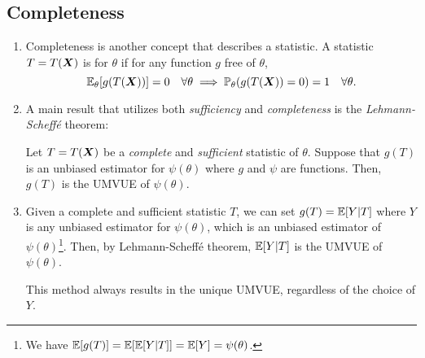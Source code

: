 \subsection{Completeness}
\begin{enumerate}
\item Completeness is another concept that describes a statistic. A statistic
\(T=T(\vb*{X})\) is  for \(\theta\) if for any function \(g\)
free of \(\theta\), 
\[
\mathbb{E}_{\theta}\qty[g(T(\vb*{X}))]=0\quad\forall \theta
\implies
\mathbb{P}_{\theta}\qty(g(T(\vb*{X}))=0)=1\quad\forall \theta.
\]
\item A main result that utilizes both \emph{sufficiency} and
\emph{completeness} is the \emph{Lehmann-Scheff\'{e}} theorem:
\begin{theorem}
\label{thm:lehmann-scheffe}
Let \(T=T(\vb*{X})\) be a \emph{complete} and \emph{sufficient} statistic of
\(\theta\). Suppose that \(g(T)\) is an unbiased estimator for \(\psi(\theta)\)
where \(g\) and \(\psi\) are functions.  Then, \(g(T)\) is the UMVUE of
\(\psi(\theta)\).
\end{theorem}
\item Given a complete and sufficient statistic \(T\), we can set
\(g(T)=\mathbb{E}\qty[Y|T]\) where \(Y\) is any unbiased estimator for \(\psi(\theta)\),
which is an unbiased estimator of \(\psi(\theta)\)\footnote{We have
\(\mathbb{E}\qty[g(T)]=\mathbb{E}\qty[\mathbb{E}\qty[Y|T]]=\mathbb{E}\qty[Y]=\psi(\theta)\).}. Then, by
Lehmann-Scheff\'{e} theorem, \(\mathbb{E}\qty[Y|T]\) is the UMVUE of \(\psi(\theta)\).

\begin{note}
This method always results in the unique UMVUE, regardless of the choice of
\(Y\).
\end{note}
\end{enumerate}
